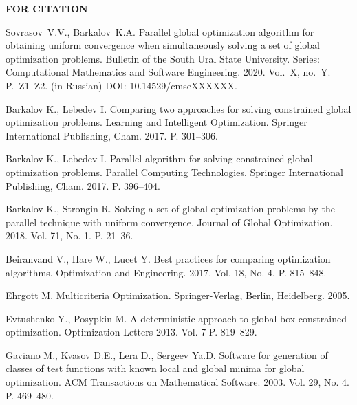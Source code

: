 \documentclass{cmi}
\begin{document}
\begin{flushleft}
  \textbf{FOR CITATION}
\end{flushleft}
\justifying

\begin{citationplace}
Sovrasov~V.V., Barkalov~K.A. Parallel global optimization algorithm for obtaining uniform convergence
when simultaneously solving a set of global optimization problems. Bulletin of the South Ural State University. Series: Computational Mathematics and Software Engineering. 2020. Vol.~X, no.~Y. P.~Z1--Z2. (in Russian) DOI: 10.14529/cmseXXXXXX.
\end{citationplace}

\begin{biblio_lat}

Barkalov K., Lebedev I.
\newblock Comparing two approaches for solving constrained global optimization
  problems.
\newblock Learning and Intelligent Optimization. Springer International
  Publishing, Cham. 2017. P. 301--306.
\newblock {}

Barkalov K., Lebedev I.
\newblock Parallel algorithm for solving constrained global optimization
  problems.
\newblock Parallel Computing Technologies. Springer International
  Publishing, Cham. 2017. P. 396--404.
\newblock {}

Barkalov K., Strongin R.
\newblock Solving a set of global optimization problems by the parallel
  technique with uniform convergence.
\newblock Journal of Global Optimization. 2018. Vol. 71, No. 1. P. 21--36.
\newblock {}

Beiranvand V., Hare W., Lucet Y.
\newblock Best practices for comparing optimization algorithms.
\newblock Optimization and Engineering. 2017. Vol. 18, No. 4. P. 815--848.
\newblock {}

Ehrgott M.
\newblock Multicriteria Optimization.
\newblock Springer-Verlag, Berlin, Heidelberg. 2005.
\newblock {}

Evtushenko Y., Posypkin M.
\newblock A deterministic approach to global box-constrained optimization.
\newblock Optimization Letters 2013. Vol. 7 P. 819--829.
\newblock {}

{Gaviano M., Kvasov D.E., Lera D., Sergeev Ya.D.}
\newblock Software for generation of classes of test functions with known local
  and global minima for global optimization.
\newblock ACM Transactions on Mathematical Software. 2003. Vol. 29, No. 4. P.
  469--480.
\newblock {}


\end{biblio_lat}
\end{document}
